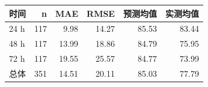 \begin{tabular}{lrrrrr}
\toprule
时间 & n & MAE & RMSE & 预测均值 & 实测均值 \\
\midrule
24 h & 117 & 9.98 & 14.27 & 85.53 & 83.44 \\
48 h & 117 & 13.99 & 18.86 & 84.79 & 75.95 \\
72 h & 117 & 19.55 & 25.57 & 84.77 & 73.99 \\
总体 & 351 & 14.51 & 20.11 & 85.03 & 77.79 \\
\bottomrule
\end{tabular}

